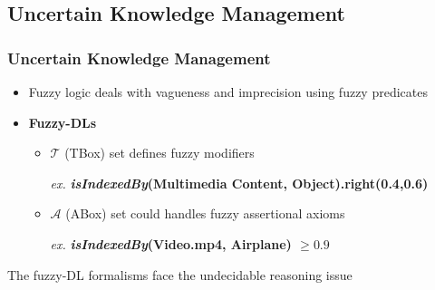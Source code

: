 % 		

\subsection{Uncertain Knowledge Management}
\begin{frame}
	\frametitle{Uncertain Knowledge Management}
		\begin{itemize}
			\item \alert{Fuzzy logic} deals with vagueness and imprecision using fuzzy predicates
			\item \textbf{Fuzzy-DLs} {\tiny{\citep{Straccia2006,Stoilos2007}}}
			
			\begin{itemize}
			  \item $\mathcal{T}$ (TBox) set defines \alert{fuzzy modifiers} {\tiny{\citep{Bobillo2011}}}

			  \alert{\textit{ex.}} {\small \textbf{\textit{isIndexedBy}(Multimedia Content, Object).right(0.4,0.6) }}
			
			  \item $\mathcal{A}$ (ABox) set could handles fuzzy assertional axioms
			
			  \alert{\textit{ex.}} \textbf{\textit{isIndexedBy}(Video.mp4, Airplane) $\geq 0.9$ }
			\end{itemize}
		\end{itemize}
		\pause
		\begin{alertblock}{}
			\alert{The fuzzy-DL formalisms face the undecidable reasoning issue \\{\tiny{\citep{Baader2011}}}}
		\end{alertblock}
\end{frame}
